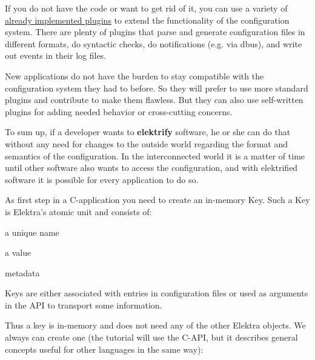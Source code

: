If you do not have the code or want to get rid of it, you can use a variety of \hyperlink{src_plugins_README_md}{already implemented plugins} to extend the functionality of the configuration system. There are plenty of plugins that parse and generate configuration files in different formats, do syntactic checks, do notifications (e.\+g. via dbus), and write out events in their log files.

New applications do not have the burden to stay compatible with the configuration system they had to before. So they will prefer to use more standard plugins and contribute to make them flawless. But they can also use self-\/written plugins for adding needed behavior or cross-\/cutting concerns.

To sum up, if a developer wants to {\bfseries elektrify} software, he or she can do that without any need for changes to the outside world regarding the format and semantics of the configuration. In the interconnected world it is a matter of time until other software also wants to access the configuration, and with elektrified software it is possible for every application to do so.

As first step in a C-\/application you need to create an in-\/memory {\ttfamily Key}. Such a {\ttfamily Key} is Elektra’s atomic unit and consists of\+:


\begin{DoxyItemize}
\item a unique name
\item a value
\item metadata
\end{DoxyItemize}

{\ttfamily Key}s are either associated with entries in configuration files or used as arguments in the A\+PI to transport some information.

Thus a key is in-\/memory and does not need any of the other Elektra objects. We always can create one (the tutorial will use the C-\/\+A\+PI, but it describes general concepts useful for other languages in the same way)\+:





